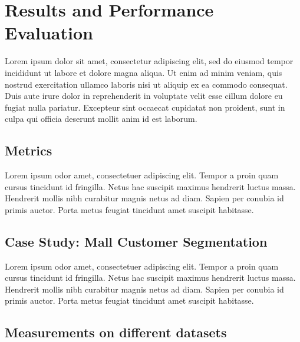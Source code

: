 \documentclass[10pt,twocolumn,letterpaper]{article}
\begin{document}

\section{Results and Performance Evaluation}\label{sec:results-and-performance-evaluation}

Lorem ipsum dolor sit amet, consectetur adipiscing elit, sed do eiusmod tempor
incididunt ut labore et dolore magna aliqua. Ut enim ad minim veniam, quis
nostrud exercitation ullamco laboris nisi ut aliquip ex ea commodo consequat.
Duis aute irure dolor in reprehenderit in voluptate velit esse cillum dolore eu
fugiat nulla pariatur. Excepteur sint occaecat cupidatat non proident, sunt in
culpa qui officia deserunt mollit anim id est laborum.


\subsection{Metrics}

Lorem ipsum odor amet, consectetuer adipiscing elit. Tempor a proin quam cursus
tincidunt id fringilla. Netus hac suscipit maximus hendrerit luctus massa.
Hendrerit mollis nibh curabitur magnis netus ad diam. Sapien per conubia id
primis auctor. Porta metus feugiat tincidunt amet suscipit habitasse.


\subsection{Case Study: Mall Customer Segmentation}

Lorem ipsum odor amet, consectetuer adipiscing elit. Tempor a proin quam cursus
tincidunt id fringilla. Netus hac suscipit maximus hendrerit luctus massa.
Hendrerit mollis nibh curabitur magnis netus ad diam. Sapien per conubia id
primis auctor. Porta metus feugiat tincidunt amet suscipit habitasse.


\subsection{Measurements on different datasets}
\end{document}
